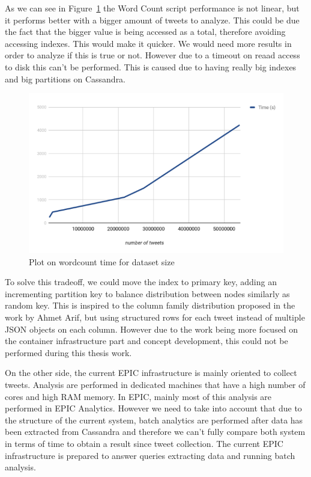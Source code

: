 As we can see in Figure~\ref{fig:wordcountplot} the Word Count script performance is not linear, but it performs better with a bigger amount of tweets to analyze. This could be due the fact that the bigger value is being accessed as a total, therefore avoiding accessing indexes. This would make it quicker. We would need more results in order to analyze if this is true or not. However due to a timeout on reaad access to disk this can’t be performed. This is caused due to having really big indexes and big partitions on Cassandra. 

\begin{figure}
\centering
\includegraphics[width=\textwidth]{Figures/wordcountplot}
\decoRule
\caption[Wordcount time plot]{Plot on wordcount time for dataset size}
\label{fig:wordcountplot}
\end{figure}

To solve this tradeoff, we could move the index to primary key, adding an incrementing partition key to balance distribution between nodes similarly as random key. This is inspired to the column family distribution proposed in the work by Ahmet Arif, but using structured rows for each tweet instead of multiple JSON objects on each column. However due to the work being more focused on the container infrastructure part and concept development, this could not be performed during this thesis work.

On the other side, the current EPIC infrastructure is mainly oriented to collect tweets. Analysis are performed in dedicated machines that have a high number of cores and high RAM memory. In EPIC, mainly most of this analysis are performed in EPIC Analytics. However we need to take into account that due to the structure of the current system, batch analytics are performed after data has been extracted from Cassandra and therefore we can’t fully compare both system in terms of time to obtain a result since tweet collection. The current EPIC infrastructure is prepared to answer queries extracting data and running batch analysis. 

